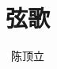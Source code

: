 \documentclass[UTF8, 12pt, openany, fontset=none]{ctexbook}
\title{弦歌}
\author{陈顶立}
\date{}
\begin{document}
\makecover
\tableofcontents

\end{document}
